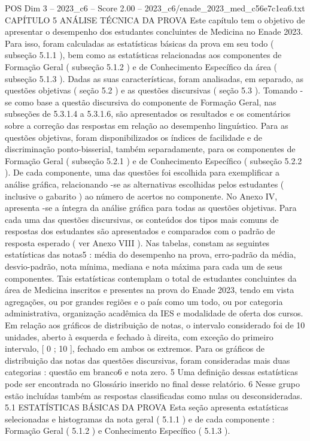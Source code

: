 \begin{textsample}{POS Dim 3 – 2023\_c6 – Score 2.00 – 2023\_c6/enade\_2023\_med\_c56e7c1ea6.txt}  \label{ex:f3_pos_102}
CAPÍTULO 5 ANÁLISE TÉCNICA DA PROVA Este capítulo tem o objetivo de apresentar o desempenho dos estudantes concluintes de Medicina no Enade 2023.
Para isso, foram calculadas as estatísticas básicas da prova em seu todo ( subseção 5.1.1 ), bem como as estatísticas relacionadas aos componentes de Formação Geral ( subseção 5.1.2 ) e de Conhecimento Específico da área ( subseção 5.1.3 ).
Dadas as suas características, foram analisadas, em separado, as questões objetivas ( seção 5.2 ) e as questões discursivas ( seção 5.3 ).
Tomando -se como base a questão discursiva do componente de Formação Geral, nas subseções de 5.3.1.4 a 5.3.1.6, são apresentados os resultados e os comentários sobre a correção das respostas em relação ao desempenho linguístico.
Para as questões objetivas, foram disponibilizados os índices de facilidade e de discriminação ponto-bisserial, também separadamente, para os componentes de Formação Geral ( subseção 5.2.1 ) e de Conhecimento Específico ( subseção 5.2.2 ).
De cada componente, uma das questões foi escolhida para exemplificar a análise gráfica, relacionando -se as alternativas escolhidas pelos estudantes ( inclusive o gabarito ) ao número de acertos no componente.
No Anexo IV, apresenta -se a íntegra da análise gráfica para todas as questões objetivas.
Para cada uma das questões discursivas, os conteúdos dos tipos mais comuns de respostas dos estudantes são apresentados e comparados com o padrão de resposta esperado ( ver Anexo VIII ).
Nas tabelas, constam as seguintes estatísticas das notas5 : média do desempenho na prova, erro-padrão da média, desvio-padrão, nota mínima, mediana e nota máxima para cada um de seus componentes.
Tais estatísticas contemplam o total de estudantes concluintes da área de Medicina inscritos e presentes na prova do Enade 2023, tendo em vista agregações, ou por grandes regiões e o país como um todo, ou por categoria administrativa, organização acadêmica da IES e modalidade de oferta dos cursos.
Em relação aos gráficos de distribuição de notas, o intervalo considerado foi de 10 unidades, aberto à esquerda e fechado à direita, com exceção do primeiro intervalo, [ 0 ; 10 ], fechado em ambos os extremos.
Para os gráficos de distribuição das notas das questões discursivas, foram consideradas mais duas categorias : questão em branco6 e nota zero. 5 Uma definição dessas estatísticas pode ser encontrada no Glossário inserido no final desse relatório. 6 Nesse grupo estão incluídas também as respostas classificadas como nulas ou desconsideradas. 5.1 ESTATÍSTICAS BÁSICAS DA PROVA Esta seção apresenta estatísticas selecionadas e histogramas da nota geral ( 5.1.1 ) e de cada componente : Formação Geral ( 5.1.2 ) e Conhecimento Específico ( 5.1.3 ).

\end{textsample}
